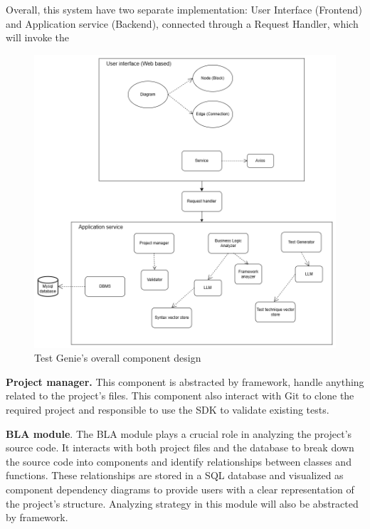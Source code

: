\hspace{0.5cm}Overall, this system have two separate implementation: User Interface (Frontend) and Application service (Backend), connected through a Request Handler, which will invoke the 
\begin{figure}[H]
	\centering
	\includegraphics[width=1.0\textwidth]{images/System design.drawio.png}
	\caption{Test Genie’s overall component design}
	\label{fig:system-design}
\end{figure}

\hspace{0.5cm}\textbf{Project manager.}	This component is abstracted by framework, handle anything related to the project’s files. This component also interact with Git to clone the required project and responsible to use the SDK to validate existing tests.

\hspace{0.5cm}\textbf{BLA module}.	The BLA module plays a crucial role in analyzing the project's source code. It interacts with both project files and the database to break down the source code into components and identify relationships between classes and functions. These relationships are stored in a SQL database and visualized as component dependency diagrams to provide users with a clear representation of the project's structure. Analyzing strategy in this module will also be abstracted by framework.

